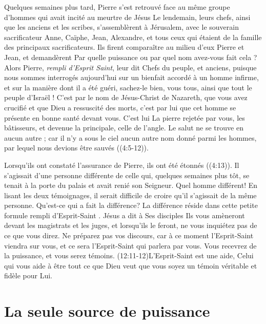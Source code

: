 Quelques semaines plus tard, Pierre s'est retrouvé face au même groupe
 d'hommes qui avait incité au meurtre de Jésus\frcolon{}
 \Og Le lendemain, leurs chefs, ainsi que les anciens et les scribes,
 s'assemblèrent à Jérusalem, avec le souverain sacrificateur Anne,
 Caïphe, Jean, Ale\-xandre, et tous ceux qui étaient de la famille
 des principaux sacrificateurs. Ils firent comparaître au milieu d'eux
 Pierre et Jean, et demandèrent\frcolon{} Par quelle puissance ou par quel nom
 avez-vous fait cela ? Alors Pierre, \emph{rempli d'Esprit Saint}, leur dit\frcolon{}
 Chefs du peuple, et anciens, puisque nous sommes interrogés aujourd'hui
 sur un bienfait accordé à un homme infirme, et sur la manière
 dont il a été guéri, sachez-le bien, vous tous, ainsi que tout le peuple
 d'Israël ! C'est par le nom de Jésus-Christ de Nazareth, que vous avez
 crucifié et que Dieu a ressuscité des morts, c'est par lui que cet homme
 se présente en bonne santé devant vous. C'est lui\frcolon{} La pierre rejetée
 par vous, les bâtisseurs, et devenue la principale, celle de l'angle.
 Le salut ne se trouve en aucun autre ; car il n'y a sous le ciel aucun
 autre nom donné parmi les hommes, par lequel nous devions être
 sauvés \Fg{} ((4:5-12)).

Lorsqu'ils ont constaté l'assurance de Pierre, ils ont été étonnés
 ((4:13)).
 Il s'agissait d'une personne différente
 de celle qui, quelques semaines plus tôt, se tenait à la porte du palais
 et avait renié son Seigneur. Quel homme différent!
 En lisant les deux témoignages, il serait difficile de croire
 qu'il s'agissait de la même personne. Qu'est-ce qui a fait la différence?
 La différence réside dans cette petite formule\frcolon{}
 \Og rempli d'Esprit-Saint \Fg{}. Jésus a dit à Ses disciples\frcolon{}
 \Og Ils vous amèneront devant les magistrats et les juges,
 et lorsqu'ils le feront, ne vous inquiétez pas de ce que vous direz.
 Ne préparez pas vos discours, car à ce moment l'Esprit-Saint viendra
 sur vous, et ce sera l'Esprit-Saint qui parlera par vous.
 Vous recevrez de la puissance, et vous serez témoins. \Fg{}
 (12:11-12)L'Esprit-Saint est une aide,
 Celui qui vous aide à être tout ce que Dieu
 veut que vous soyez\frcolon{} un témoin véritable et fidèle pour Lui.


\section{La seule source de puissance}

